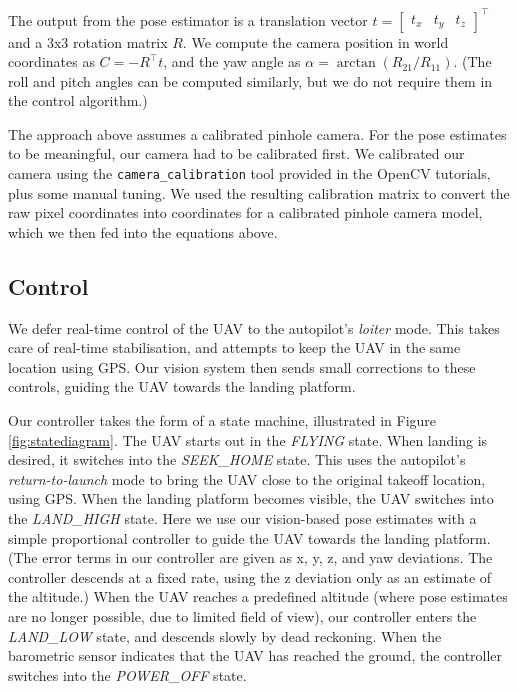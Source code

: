 \documentclass[10pt]{scrartcl} %
\begin{document}

The output from the pose estimator is a translation vector
$t = \begin{bmatrix} t_x & t_y & t_z \end{bmatrix}^\top$
and a 3x3 rotation matrix $R$. We compute the camera position in world
coordinates as $C = -R^\top t$, and the yaw angle as
$\alpha = \arctan(R_{21} / R_{11})$. (The roll and pitch angles can be computed
similarly, but we do not require them in the control algorithm.)

The approach above assumes a calibrated pinhole camera. For the pose estimates
to be meaningful, our camera had to be calibrated first. We calibrated our
camera using the {\tt camera\_calibration} tool provided in the OpenCV
tutorials, plus some manual tuning. We used the resulting calibration matrix to
convert the raw pixel coordinates into coordinates for a calibrated pinhole
camera model, which we then fed into the equations above.


\subsection{Control}

We defer real-time control of the UAV to the autopilot's \textit{loiter} mode.
This takes care of real-time stabilisation, and attempts to keep the UAV in the
same location using GPS. Our vision system then sends small corrections to
these controls, guiding the UAV towards the landing platform.


Our controller takes the form of a state machine, illustrated in Figure
\ref{fig:statediagram}. The UAV starts out in the \textit{FLYING} state. When
landing is desired, it switches into the \textit{SEEK\_HOME} state. This uses
the autopilot's \textit{return-to-launch} mode to bring the UAV close to the
original takeoff location, using GPS. When the landing platform becomes
visible, the UAV switches into the \textit{LAND\_HIGH} state. Here we use our
vision-based pose estimates with a simple proportional controller to guide the
UAV towards the landing platform. (The error terms in our controller are given
as x, y, z, and yaw deviations. The controller descends at a fixed rate, using
the z deviation only as an estimate of the altitude.) When the UAV reaches a
predefined altitude (where pose estimates are no longer possible, due to
limited field of view), our controller enters the \textit{LAND\_LOW} state, and
descends slowly by dead reckoning. When the barometric sensor indicates that
the UAV has reached the ground, the controller switches into the
\textit{POWER\_OFF} state.
\end{document}
